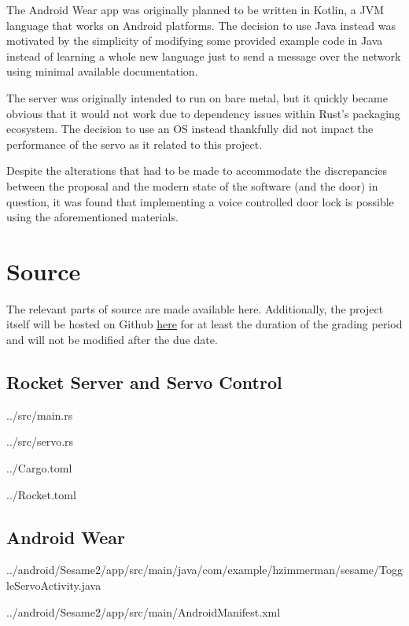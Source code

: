 \documentclass[a4paper]{article}
\begin{document}
The Android Wear app was originally planned to be written in Kotlin, a JVM language that works on Android platforms.
The decision to use Java instead was motivated by the simplicity of modifying some provided example code in Java instead of learning a whole new language just to send a message over the network using minimal available documentation.

The server was originally intended to run on bare metal, but it quickly became obvious that it would not work due to dependency issues within Rust's packaging ecosystem.
The decision to use an OS instead thankfully did not impact the performance of the servo as it related to this project.


Despite the alterations that had to be made to accommodate the discrepancies between the proposal and the modern state of the software (and the door) in question,
it was found that implementing a voice controlled door lock is possible using the aforementioned materials.


\section{Source}\label{sec:source}
The relevant parts of source are made available here.
Additionally, the project itself will be hosted on Github \href{https://github.com/hgzimmerman/CMPE-240-Sesame-Server}{here} for at least the duration of the grading period and will not be modified after the due date.

\subsection{Rocket Server and Servo Control}\label{subsec:server}


{../src/main.rs}


{../src/servo.rs}



{../Cargo.toml}


{../Rocket.toml}

\subsection{Android Wear}\label{subsec:androidWear}

{../android/Sesame2/app/src/main/java/com/example/hzimmerman/sesame/ToggleServoActivity.java}


{../android/Sesame2/app/src/main/AndroidManifest.xml}
\end{document}
